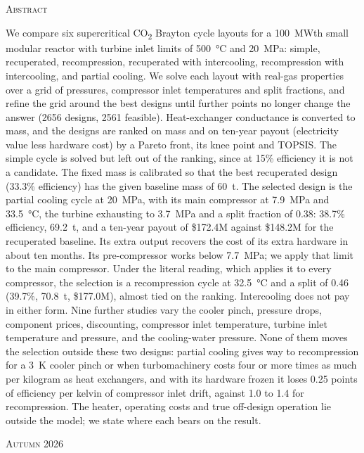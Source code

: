\documentclass[11pt,a4paper]{article}
\newcommand{\cotwo}{CO\textsubscript{2}}
\begin{document}
\begin{titlepage}
\vspace{1.4cm}
\begin{minipage}{0.9\textwidth}
\small
{\centering\scshape Abstract\par}\vspace{0.2cm}
\setlength{\parindent}{0pt}\linespread{1.08}\selectfont
We compare six supercritical \cotwo{} Brayton cycle layouts for a \SI{100}{MWth} small modular reactor with turbine inlet limits of \SI{500}{\celsius} and \SI{20}{MPa}: simple, recuperated, recompression, recuperated with intercooling, recompression with intercooling, and partial cooling. We solve each layout with real-gas properties over a grid of pressures, compressor inlet temperatures and split fractions, and refine the grid around the best designs until further points no longer change the answer (2656 designs, 2561 feasible). Heat-exchanger conductance is converted to mass, and the designs are ranked on mass and on ten-year payout (electricity value less hardware cost) by a Pareto front, its knee point and TOPSIS. The simple cycle is solved but left out of the ranking, since at 15\% efficiency it is not a candidate. The fixed mass is calibrated so that the best recuperated design (33.3\% efficiency) has the given baseline mass of \SI{60}{t}. The selected design is the partial cooling cycle at \SI{20}{MPa}, with its main compressor at \SI{7.9}{MPa} and \SI{33.5}{\celsius}, the turbine exhausting to \SI{3.7}{MPa} and a split fraction of 0.38: 38.7\% efficiency, \SI{69.2}{t}, and a ten-year payout of \$172.4M against \$148.2M for the recuperated baseline. Its extra output recovers the cost of its extra hardware in about ten months. Its pre-compressor works below \SI{7.7}{MPa}; we apply that limit to the main compressor. Under the literal reading, which applies it to every compressor, the selection is a recompression cycle at \SI{32.5}{\celsius} and a split of 0.46 (39.7\%, \SI{70.8}{t}, \$177.0M), almost tied on the ranking. Intercooling does not pay in either form. Nine further studies vary the cooler pinch, pressure drops, component prices, discounting, compressor inlet temperature, turbine inlet temperature and pressure, and the cooling-water pressure. None of them moves the selection outside these two designs: partial cooling gives way to recompression for a \SI{3}{K} cooler pinch or when turbomachinery costs four or more times as much per kilogram as heat exchangers, and with its hardware frozen it loses 0.25 points of efficiency per kelvin of compressor inlet drift, against 1.0 to 1.4 for recompression. The heater, operating costs and true off-design operation lie outside the model; we state where each bears on the result.
\end{minipage}

\vfill
{\scshape Autumn 2026\par}
\restoregeometry
\end{titlepage}
\end{document}
